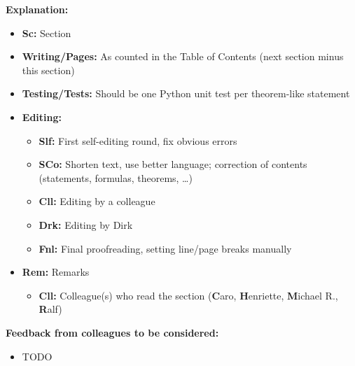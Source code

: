 \clearpage

\noindent
\textbf{Explanation:}

\begin{itemize}
  \item
  \textbf{Sc:}
  Section
  
  \item
  \textbf{Writing/Pages:}
  As counted in the Table of Contents
  (next section minus this section)
  
  \item
  \textbf{Testing/Tests:}
  Should be one Python unit test per theorem-like statement
  
  \item
  \textbf{Editing:}
  \begin{itemize}
    \item
    \textbf{Slf:}
    First self-editing round, fix obvious errors
    
    \item
    \textbf{SCo:}
    Shorten text, use better language;
    correction of contents (statements, formulas, theorems, \dots)
    
    \item
    \textbf{Cll:}
    Editing by a colleague
    
    \item
    \textbf{Drk:}
    Editing by Dirk
    
    \item
    \textbf{Fnl:}
    Final proofreading, setting line/page breaks manually
  \end{itemize}
  
  \item
  \textbf{Rem:}
  Remarks
  \begin{itemize}
    \item
    \textbf{Cll:}
    Colleague(s) who read the section
    (\textbf{C}aro,
    \textbf{H}enriette,
    \textbf{M}ichael R.,
    \textbf{R}alf)
  \end{itemize}
\end{itemize}

\noindent
\textbf{Feedback from colleagues to be considered:}

\begin{itemize}
  \item
  TODO
\end{itemize}

\cleardoublepage
